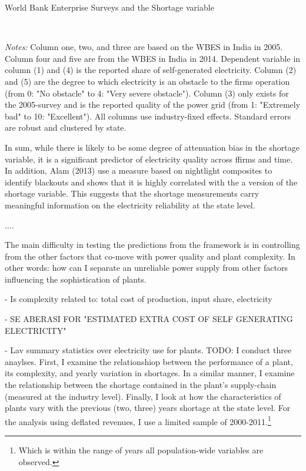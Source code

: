 \documentclass[11pt]{article}
\begin{document}
\begin{table}
    \caption{World Bank Enterprise Surveys and the Shortage variable}
    \label{tab:wbes}
    \begin{minipage}{0.95\textwidth} 

    \\
    { \footnotesize \textit{Notes:} Column one, two, and three are based on the WBES in India in 2005. Column four and five are from the WBES in India in 2014. Dependent variable in column (1) and (4) is the reported share of self-generated electricity. Column (2) and (5) are the degree to which electricity is an obstacle to the firms operation (from 0: "No obstacle" to 4: "Very severe obstacle"). Column (3) only exists for the 2005-survey and is the reported quality of the power grid (from 1: "Extremely bad" to 10: "Excellent"). All columns use industry-fixed effects. Standard errors are robust and clustered by state. \\
\par}
    \end{minipage}
\end{table}   

In sum, while there is likely to be some degree of attenuation bias in the shortage variable, it is a significant predictor of electricity quality across ffirms and time. In addition, Alam (2013) use a measure based on nightlight composites to identify blackouts and shows that it is highly correlated with the a version of the shortage variable. This suggests that the shortage measurements carry meaningful information on the electricity reliability at the state level.

....

The main difficulty in testing the predictions from the framework is in controlling from the other factors that co-move with power quality and plant complexity. In other words: how can I separate an unreliable power supply from other factors influencing the sophistication of plants. 

- Is complexity related to: total cost of production, input share, electricity 

- SE ABERASI FOR "ESTIMATED EXTRA COST OF SELF GENERATING ELECTRICITY"

- Lav summary statistics over electricity use for plants.
TODO: I conduct three anaylses. First, I examine the relationshiop between the performance of a plant, its complexity, and yearly variation in shortages. In a similar manner, I examine the relationship between the shortage contained in the plant's supply-chain (measured at the industry level). Finally, I look at how the characteristics of plants vary with the previous (two, three) years shortage at the state level. For the analysis using deflated revenues, I use a limited sample of 2000-2011.\footnote{Which is within the range of years all population-wide variables are observed.} 
\end{document}
